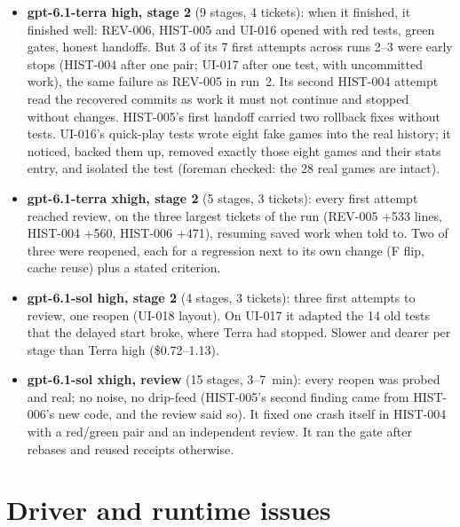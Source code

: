 \documentclass[11pt,a4paper]{article}
\begin{document}
\begin{itemize}
  \item \textbf{gpt-6.1-terra high, stage 2} (9 stages, 4 tickets): when it finished, it finished
        well: REV-006, HIST-005 and UI-016 opened with red tests, green gates, honest handoffs.
        But 3 of its 7 first attempts across runs 2--3 were early stops (HIST-004 after one pair;
        UI-017 after one test, with uncommitted work), the same failure as REV-005 in run~2. Its
        second HIST-004 attempt read the recovered commits as work it must not continue and
        stopped without changes. HIST-005's first handoff carried two rollback fixes without
        tests. UI-016's quick-play tests wrote eight fake games into the real 
        history; it noticed, backed them up, removed exactly those eight games and their stats
        entry, and isolated the test (foreman checked: the 28 real games are intact).
  \item \textbf{gpt-6.1-terra xhigh, stage 2} (5 stages, 3 tickets): every first attempt reached
        review, on the three largest tickets of the run (REV-005 +533 lines, HIST-004 +560,
        HIST-006 +471), resuming saved work when told to. Two of three were reopened, each for
        a regression next to its own change (F flip, cache reuse) plus a stated criterion.
  \item \textbf{gpt-6.1-sol high, stage 2} (4 stages, 3 tickets): three first attempts to review,
        one reopen (UI-018 layout). On UI-017 it adapted the 14 old tests that the delayed start
        broke, where Terra had stopped. Slower and dearer per stage than Terra high
        (\$0.72--1.13).
  \item \textbf{gpt-6.1-sol xhigh, review} (15 stages, 3--7~min): every reopen was probed and
        real; no noise, no drip-feed (HIST-005's second finding came from HIST-006's new code, and
        the review said so). It fixed one crash itself in HIST-004 with a red/green pair and an
        independent review. It ran the gate after rebases and reused receipts otherwise.
\end{itemize}

\section*{Driver and runtime issues}
\end{document}
